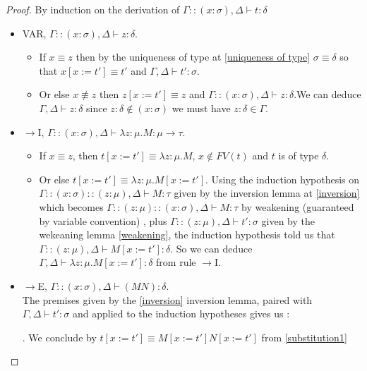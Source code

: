 \documentclass{article}
\begin{document}
    \begin{proof}
        By induction on the derivation of $\Gamma::(x:\sigma),\Delta\vdash t : \delta$
        \begin{itemize}
            \item VAR, $\Gamma::(x:\sigma),\Delta\vdash z : \delta$. 
            \begin{itemize}
                \item If $x\equiv z$ then by the uniqueness of type at \ref{uniqueness of type} $\sigma\equiv\delta$ so that $x[x:=t']\equiv t'$ and $\Gamma,\Delta\vdash t': \sigma$.
                \item Or else $x\not\equiv z$ then $z[x:=t']\equiv z$ and $\Gamma::(x:\sigma),\Delta\vdash z : \delta$.We can deduce $\Gamma,\Delta\vdash z : \delta$ since $z : \delta\not\in (x : \sigma)$ we must have $z :\delta \in \Gamma$.
            \end{itemize} 

            \item $\rightarrow$I, $\Gamma::(x:\sigma),\Delta\vdash\lambda z:\mu.M : \mu\rightarrow\tau$.
            \begin{itemize}
                \item If $x\equiv z$, then $t[x:=t']\equiv\lambda z:\mu.M$, $x\not\in FV(t)$ and $t$ is of type $\delta$.
                \item Or else $t[x:=t']\equiv\lambda z:\mu.M[x:=t']$. Using the induction hypothesis on $\Gamma::(x:\sigma)::(z : \mu),\Delta\vdash M :\tau$ given by the inversion lemma at \ref{inversion} which becomes $\Gamma::(z : \mu)::(x:\sigma),\Delta\vdash M :\tau$ by weakening (guaranteed by variable convention) , plus $\Gamma::(z : \mu),\Delta\vdash t':\sigma$ given by the wekeaning lemma \ref{weakening}, the induction hypothesis told us that $\Gamma::(z:\mu),\Delta\vdash M[x:=t'] : \delta$. So we can deduce $\Gamma,\Delta\vdash\lambda z : \mu.M[x:=t'] : \delta$ from rule $\rightarrow$I.
            \end{itemize} 

            \item $\rightarrow$E, $\Gamma::(x:\sigma),\Delta\vdash(M N) : \delta$.\\ The premises given by the \ref{inversion} inversion lemma, paired with $\Gamma,\Delta\vdash t' : \sigma$ and applied to the induction hypotheses gives us :
                
            \begin{prooftree}
            \end{prooftree}. We conclude by $t[x:=t']\equiv M[x:=t'] N[x:=t']$ from \ref{substitution1}


\end{itemize}
\end{proof}
\end{document}
